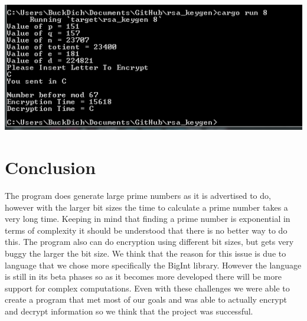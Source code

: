 \documentclass[12pt,journal,compsoc]{IEEEtran}
\begin{document}
\includegraphics[scale=0.6]{Capture.png}


\section{Conclusion}
The program does generate large prime numbers as it is advertised to do, however with the larger bit sizes the time to calculate a prime number takes a very long time. Keeping in mind that finding a prime number is exponential in terms of complexity it should be understood that there is no better way to do this. The program also can do encryption using different bit sizes, but gets very buggy the larger the bit size. We think that the reason for this issue is due to language that we chose more specifically the BigInt library. However the language is still in its beta phases so as it becomes more developed there will be more support for complex computations. Even with these challenges we were able to create a program that met most of our goals and was able to actually encrypt and decrypt information so we think that the project was successful. 

\appendices

\end{document}
